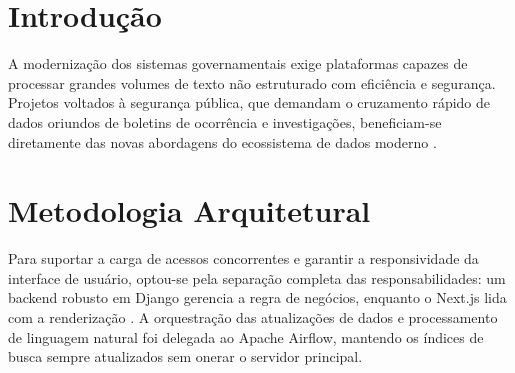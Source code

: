 \vspace{1cm}

\section{Introdução}
A modernização dos sistemas governamentais exige plataformas capazes de processar grandes volumes de texto não estruturado com eficiência e segurança. Projetos voltados à segurança pública, que demandam o cruzamento rápido de dados oriundos de boletins de ocorrência e investigações, beneficiam-se diretamente das novas abordagens do ecossistema de dados moderno \cite{silva2023}. 

\section{Metodologia Arquitetural}
Para suportar a carga de acessos concorrentes e garantir a responsividade da interface de usuário, optou-se pela separação completa das responsabilidades: um backend robusto em Django gerencia a regra de negócios, enquanto o Next.js lida com a renderização \cite{carvalho2024}. A orquestração das atualizações de dados e processamento de linguagem natural foi delegada ao Apache Airflow, mantendo os índices de busca sempre atualizados sem onerar o servidor principal.

\vspace{1cm}
\vspace{0.3cm}

\printbibliography[heading=nossabibliografia]